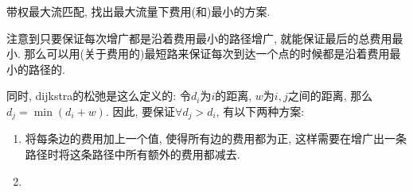 \documentclass[a5paper]{minimal}
\begin{document}
带权最大流匹配, 找出最大流量下费用(和)最小的方案.

注意到只要保证每次增广都是沿着费用最小的路径增广, 就能保证最后的总费用最小.
那么可以用(关于费用的)最短路来保证每次到达一个点的时候都是沿着费用最小的路径的.

同时, dijkstra的松弛是这么定义的: 令$d_i$为$i$的距离, $w$为$i, j$之间的距离,
那么$d_j = \min(d_i + w)$. 因此, 要保证$\forall d_j > d_i$, 有以下两种方案:

\begin{enumerate}
    \item 将每条边的费用加上一个值, 使得所有边的费用都为正,
        这样需要在增广出一条路径时将这条路径中所有额外的费用都减去.
    \item 
\end{enumerate}
\end{document}
